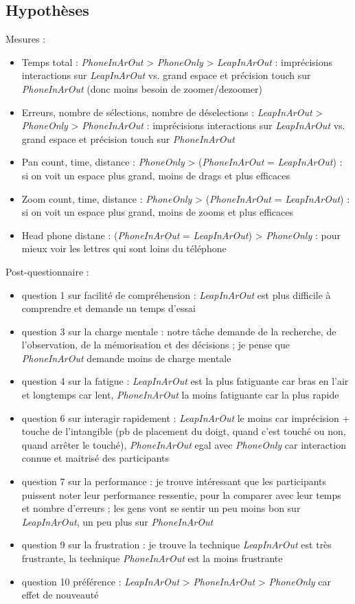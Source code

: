 \subsection{Hypothèses}
Mesures :
\begin{itemize}
  \item Temps total : \textit{PhoneInArOut} > \textit{PhoneOnly} > \textit{LeapInArOut} : imprécisions interactions sur \textit{LeapInArOut} vs. grand espace et précision touch sur \textit{PhoneInArOut} (donc moins besoin de zoomer/dezoomer)
  \item Erreurs, nombre de sélections, nombre de déselections : \textit{LeapInArOut} > \textit{PhoneOnly} > \textit{PhoneInArOut} : imprécisions interactions sur \textit{LeapInArOut} vs. grand espace et précision touch sur \textit{PhoneInArOut}
  \item Pan count, time, distance : \textit{PhoneOnly} > (\textit{PhoneInArOut} = \textit{LeapInArOut}) : si on voit un espace plus grand, moins de drags et plus efficaces
  \item Zoom count, time, distance : \textit{PhoneOnly} > (\textit{PhoneInArOut} = \textit{LeapInArOut}) : si on voit un espace plus grand, moins de zooms et plus efficaces
  \item Head phone distane : (\textit{PhoneInArOut} = \textit{LeapInArOut}) > \textit{PhoneOnly} : pour mieux voir les lettres qui sont loins du téléphone
\end{itemize}

Post-questionnaire :
\begin{itemize}
  \item question 1 sur facilité de compréhension : \textit{LeapInArOut} est plus difficile à comprendre et demande un temps d'essai
  \item question 3 sur la charge mentale : notre tâche demande de la recherche, de l'observation, de la mémorisation et des décisions ; je pense que \textit{PhoneInArOut} demande moins de charge mentale
  \item question 4 sur la fatigue : \textit{LeapInArOut} est la plus fatiguante car bras en l'air et longtemps car lent, \textit{PhoneInArOut} la moins fatiguante car la plus rapide
  \item question 6 sur interagir rapidement : \textit{LeapInArOut} le moins car imprécision + touche de l'intangible (pb de placement du doigt, quand c'est touché ou non, quand arrêter le touché), \textit{PhoneInArOut} egal avec \textit{PhoneOnly} car interaction connue et maitrisé des participants
  \item question 7 sur la performance : je trouve intéressant que les participants puissent noter leur performance ressentie, pour la comparer avec leur temps et nombre d'erreurs ; les gens vont se sentir un peu moins bon sur \textit{LeapInArOut}, un peu plus sur \textit{PhoneInArOut}
  \item question 9 sur la frustration : je trouve la technique \textit{LeapInArOut} est très frustrante, la technique \textit{PhoneInArOut} est la moins frustrante
  \item question 10 préférence : \textit{LeapInArOut} > \textit{PhoneInArOut} > \textit{PhoneOnly} car effet de nouveauté
\end{itemize}


